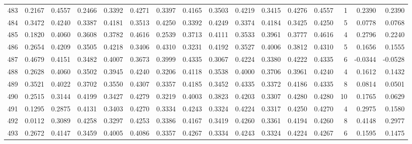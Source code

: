\begin{tabular}{lrrrrrrrrrrrrrrr}
483 &      0.2167 &  0.4557 &  0.2466 &  0.3392 &  0.4271 &  0.3397 &  0.4165 &  0.3503 &  0.4219 &  0.3415 &   0.4276 &     0.4557 &      1 &                    0.2390 &                     0.2390 \\
484 &      0.3472 &  0.4240 &  0.3387 &  0.4181 &  0.3513 &  0.4250 &  0.3392 &  0.4249 &  0.3374 &  0.4184 &   0.3425 &     0.4250 &      5 &                    0.0778 &                     0.0768 \\
485 &      0.1820 &  0.4060 &  0.3608 &  0.3782 &  0.4616 &  0.2539 &  0.3713 &  0.4111 &  0.3533 &  0.3961 &   0.3777 &     0.4616 &      4 &                    0.2796 &                     0.2240 \\
486 &      0.2654 &  0.4209 &  0.3505 &  0.4218 &  0.3406 &  0.4310 &  0.3231 &  0.4192 &  0.3527 &  0.4006 &   0.3812 &     0.4310 &      5 &                    0.1656 &                     0.1555 \\
487 &      0.4679 &  0.4151 &  0.3482 &  0.4007 &  0.3673 &  0.3999 &  0.4335 &  0.3067 &  0.4224 &  0.3380 &   0.4222 &     0.4335 &      6 &                   -0.0344 &                    -0.0528 \\
488 &      0.2628 &  0.4060 &  0.3502 &  0.3945 &  0.4240 &  0.3206 &  0.4118 &  0.3538 &  0.4000 &  0.3706 &   0.3961 &     0.4240 &      4 &                    0.1612 &                     0.1432 \\
489 &      0.3521 &  0.4022 &  0.3702 &  0.3550 &  0.4307 &  0.3357 &  0.4185 &  0.3452 &  0.4335 &  0.3372 &   0.4186 &     0.4335 &      8 &                    0.0814 &                     0.0501 \\
490 &      0.2515 &  0.3144 &  0.4199 &  0.3427 &  0.4279 &  0.3219 &  0.4003 &  0.3823 &  0.4203 &  0.3307 &   0.4280 &     0.4280 &     10 &                    0.1765 &                     0.0629 \\
491 &      0.1295 &  0.2875 &  0.4131 &  0.3403 &  0.4270 &  0.3334 &  0.4243 &  0.3324 &  0.4224 &  0.3317 &   0.4250 &     0.4270 &      4 &                    0.2975 &                     0.1580 \\
492 &      0.0112 &  0.3089 &  0.4258 &  0.3297 &  0.4253 &  0.3386 &  0.4167 &  0.3419 &  0.4260 &  0.3361 &   0.4194 &     0.4260 &      8 &                    0.4148 &                     0.2977 \\
493 &      0.2672 &  0.4147 &  0.3459 &  0.4005 &  0.4086 &  0.3357 &  0.4267 &  0.3334 &  0.4243 &  0.3324 &   0.4224 &     0.4267 &      6 &                    0.1595 &                     0.1475 \\

\end{tabular}
